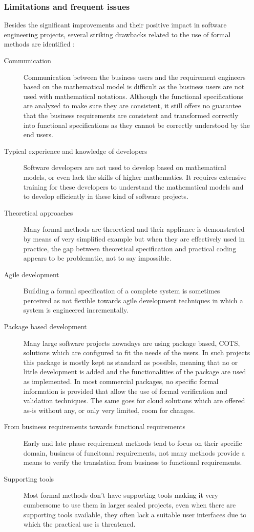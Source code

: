 \subsubsection{Limitations and frequent issues}
\label{sec:drawbacks}
Besides the significant improvements and their positive impact in software engineering projects, several striking drawbacks related to the use of formal methods are identified  :
\begin{description}
	\item[Communication] Communication between the business users and the requirement engineers based on the mathematical model is difficult as the business users are not used with mathematical notations. Although the functional specifications are analyzed to make sure they are consistent, it still offers no guarantee that the business requirements are consistent and transformed correctly into functional specifications as they cannot be correctly understood by the end users.
	\item[Typical experience and knowledge of developers] Software developers are not used to develop based on mathematical models, or even lack the skills of higher mathematics. It requires extensive training for these developers to understand the mathematical models and to develop efficiently in these kind of software projects.
	\item[Theoretical approaches] Many formal methods are theoretical and their appliance is demonstrated by means of very simplified example but when they are effectively used in practice, the gap between theoretical specification and practical coding appears to be problematic, not to say impossible.
	\item[Agile development] Building a formal specification of a complete system is sometimes perceived as not flexible towards agile development techniques in which a system is engineered incrementally. 
	\item[Package based development] Many large software projects nowadays are using package based, COTS, solutions which are configured to fit the needs of the users. In such projects this package is mostly kept as standard as possible, meaning that no or little development is added and the functionalities of the package are used as implemented. In most commercial packages, no specific formal information is provided that allow the use of formal verification and validation techniques. The same goes for cloud solutions which are offered as-is without any, or only very limited, room for changes.
	\item[From business requirements towards functional requirements]Early and late phase requirement methods tend to focus on their specific domain, business of funcitonal requirements, not many methods provide a means to verify the translation from business to functional requirements.
	\item[Supporting tools] Most formal methods don't have supporting tools making it very cumbersome to use them in larger scaled projects, even when there are supporting tools available, they often lack a suitable user interfaces due to which the practical use is threatened.


\end{description}
